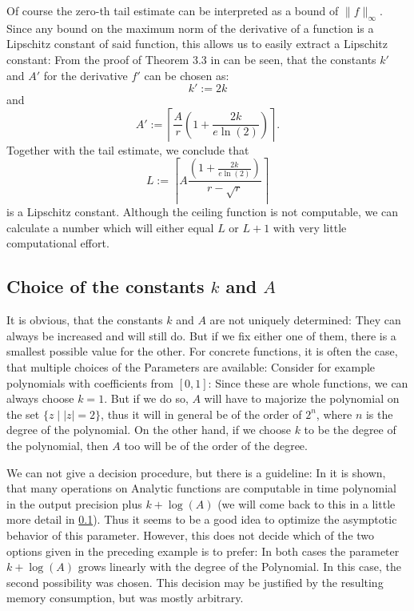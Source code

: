 		Of course the zero-th tail estimate can be interpreted as a bound of $\|f\|_\infty$. Since any bound on the maximum norm of the derivative of a function is a Lipschitz constant of said function, this allows us to easily extract a Lipschitz constant: From the proof of Theorem 3.3 in \cite{gevrey} can be seen, that the constants $k'$ and $A'$ for the derivative $f'$ can be chosen as:
		\[ k' := 2 k \]
		and
		\[ A' := \left\lceil \frac{A}{r} \left(1+ \frac{2k}{e \ln(2)}\right)\right\rceil. \]
		Together with the tail estimate, we conclude that
		\[ L := \left\lceil A \frac{\left(1 + \frac{2k}{e\ln(2)}\right)}{r-\sqrt{r}}\right\rceil \]
		is a Lipschitz constant.
		Although the ceiling function is not computable, we can calculate a number which will either equal $L$ or $L+1$ with very little computational effort.

	\subsection[Choice of the constants k and A]{Choice of the constants $k$ and $A$}

		It is obvious, that the constants $k$ and $A$ are not uniquely determined: They can always be increased and will still do. But if we fix either one of them, there is a smallest possible value for the other. For concrete functions, it is often the case, that multiple choices of the Parameters are available: Consider for example polynomials with coefficients from $[0,1]$: Since these are whole functions, we can always choose $k=1$. But if we do so, $A$ will have to majorize the polynomial on the set $\{z\mid |z| =2\}$, thus it will in general be of the order of $2^n$, where $n$ is the degree of the polynomial. On the other hand, if we choose $k$ to be the degree of the polynomial, then $A$ too will be of the order of the degree.

		We can not give a decision procedure, but there is a guideline: In \cite{gevrey} it is shown, that many operations on Analytic functions are computable in time polynomial in the output precision plus $k + \log(A)$ (we will come back to this in a little more detail in \cref{}). Thus it seems to be a good idea to optimize the asymptotic behavior of this parameter. However, this does not decide which of the two options given in the preceding example is to prefer: In both cases the parameter $k+\log(A)$ grows linearly with the degree of the Polynomial. In this case, the second possibility was chosen. This decision may be justified by the resulting memory consumption, but was mostly arbitrary.

